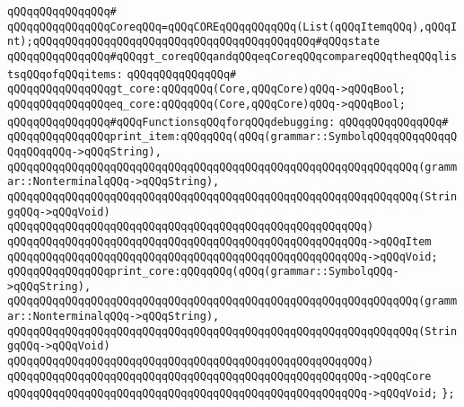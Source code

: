 \verb|qQQqqQQqqQQqqQQq#|\newline
\verb|qQQqqQQqqQQqqQQqCoreqQQq=qQQqCOREqQQqqQQqqQQq(List(qQQqItemqQQq),qQQqInt);qQQqqQQqqQQqqQQqqQQqqQQqqQQqqQQqqQQqqQQqqQQq#qQQqstate|\newline
\newline
\verb|qQQqqQQqqQQqqQQq#qQQqgt_coreqQQqandqQQqeqCoreqQQqcompareqQQqtheqQQqlistsqQQqofqQQqitems:|\newline
\verb|qQQqqQQqqQQqqQQq#|\newline
\verb|qQQqqQQqqQQqqQQqgt_core:qQQqqQQq(Core,qQQqCore)qQQq->qQQqBool;|\newline
\verb|qQQqqQQqqQQqqQQqeq_core:qQQqqQQq(Core,qQQqCore)qQQq->qQQqBool;|\newline
\newline
\verb|qQQqqQQqqQQqqQQq#qQQqFunctionsqQQqforqQQqdebugging:|\newline
\verb|qQQqqQQqqQQqqQQq#|\newline
\verb|qQQqqQQqqQQqqQQqprint_item:qQQqqQQq(qQQq(grammar::SymbolqQQqqQQqqQQqqQQqqQQqqQQq->qQQqString),|\newline
\verb|qQQqqQQqqQQqqQQqqQQqqQQqqQQqqQQqqQQqqQQqqQQqqQQqqQQqqQQqqQQqqQQq(grammar::NonterminalqQQq->qQQqString),|\newline
\verb|qQQqqQQqqQQqqQQqqQQqqQQqqQQqqQQqqQQqqQQqqQQqqQQqqQQqqQQqqQQqqQQq(StringqQQq->qQQqVoid)|\newline
\verb|qQQqqQQqqQQqqQQqqQQqqQQqqQQqqQQqqQQqqQQqqQQqqQQqqQQqqQQq)|\newline
\verb|qQQqqQQqqQQqqQQqqQQqqQQqqQQqqQQqqQQqqQQqqQQqqQQqqQQqqQQq->qQQqItem|\newline
\verb|qQQqqQQqqQQqqQQqqQQqqQQqqQQqqQQqqQQqqQQqqQQqqQQqqQQqqQQq->qQQqVoid;|\newline
\newline
\verb|qQQqqQQqqQQqqQQqprint_core:qQQqqQQq(qQQq(grammar::SymbolqQQq->qQQqString),|\newline
\verb|qQQqqQQqqQQqqQQqqQQqqQQqqQQqqQQqqQQqqQQqqQQqqQQqqQQqqQQqqQQqqQQq(grammar::NonterminalqQQq->qQQqString),|\newline
\verb|qQQqqQQqqQQqqQQqqQQqqQQqqQQqqQQqqQQqqQQqqQQqqQQqqQQqqQQqqQQqqQQq(StringqQQq->qQQqVoid)|\newline
\verb|qQQqqQQqqQQqqQQqqQQqqQQqqQQqqQQqqQQqqQQqqQQqqQQqqQQqqQQq)|\newline
\verb|qQQqqQQqqQQqqQQqqQQqqQQqqQQqqQQqqQQqqQQqqQQqqQQqqQQqqQQq->qQQqCore|\newline
\verb|qQQqqQQqqQQqqQQqqQQqqQQqqQQqqQQqqQQqqQQqqQQqqQQqqQQqqQQq->qQQqVoid;|\newline
\verb|};|\newline
\newline


